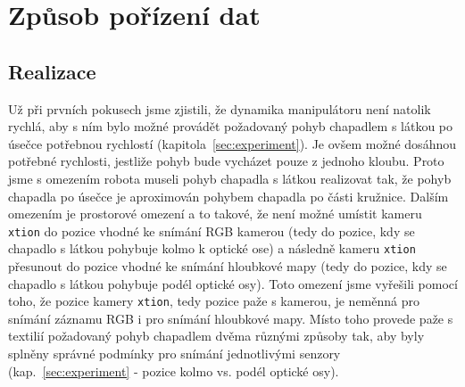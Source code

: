 \documentclass[10pt,a4paper,titlepage,oneside]{report}
\begin{document}

\chapter{Způsob pořízení dat}
\label{chap:proveData}
\section{Realizace}
Už při prvních pokusech jsme zjistili, že dynamika manipulátoru není natolik rychlá, aby s ním bylo možné provádět požadovaný pohyb  chapadlem s látkou po úsečce potřebnou rychlostí (kapitola~\ref{sec:experiment}). Je ovšem možné dosáhnou potřebné rychlosti, jestliže pohyb bude vycházet pouze z jednoho kloubu. Proto jsme s omezením robota museli pohyb chapadla s látkou realizovat tak, že pohyb chapadla po úsečce je aproximován pohybem chapadla po části kružnice. Dalším omezením je prostorové omezení a to takové, že není možné umístit kameru \verb|xtion| do pozice vhodné ke snímání RGB kamerou (tedy do pozice, kdy se chapadlo s látkou pohybuje kolmo k optické ose) a následně kameru \verb|xtion| přesunout do pozice vhodné ke snímání hloubkové mapy (tedy do pozice, kdy se chapadlo s látkou pohybuje podél optické osy). Toto omezení jsme vyřešili pomocí toho, že pozice kamery \verb|xtion|, tedy pozice paže s kamerou, je neměnná pro snímání záznamu RGB i pro snímání hloubkové mapy. Místo toho provede paže s textilií požadovaný pohyb chapadlem dvěma různými způsoby tak, aby byly splněny správné podmínky pro snímání jednotlivými senzory (kap.~\ref{sec:experiment} - pozice kolmo vs. podél optické osy).
\end{document}
